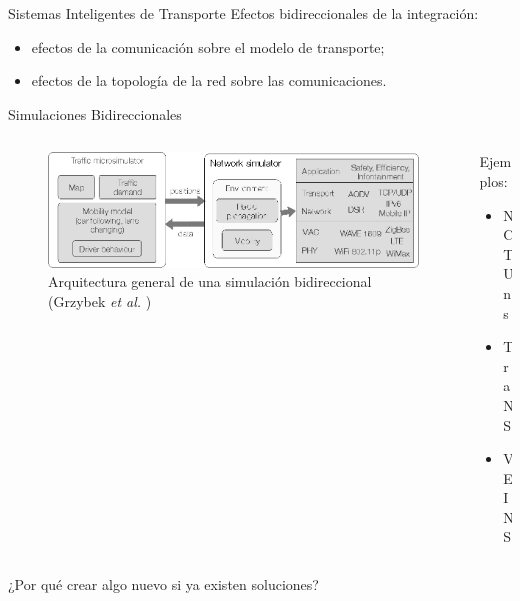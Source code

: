 \documentclass[aspectratio=169]{beamer}
\begin{document}
\begin{frame}{Sistemas Inteligentes de Transporte}
Efectos bidireccionales de la integración:\pause
\begin{itemize}
    \item efectos de la comunicación sobre el modelo de transporte;\pause
    \item efectos de la topología de la red sobre las comunicaciones.
\end{itemize}
\end{frame}

\begin{frame}{Simulaciones Bidireccionales}
\begin{columns}
    \begin{column}{.75\linewidth}
        \begin{figure}[p]
            \centering
            \includegraphics[width=\textwidth]{figuras/bidirectionalsimul.png}
            \caption{Arquitectura general de una simulación bidireccional\\(Grzybek \emph{et al.} \autocite{trendsvanet2012})}
            \label{fig:bidirsimulation}
        \end{figure}
    \end{column}
    \begin{column}{.25\linewidth}
        Ejemplos:
        \begin{itemize}
            \item NCTUns \autocite{nctuns6}
            \item TraNS \autocite{piorkowski2008trans}
            \item VEINS \autocite{sommer_german_dressler}
        \end{itemize}        
    \end{column}
\end{columns}
\end{frame}

\begin{frame}[standout]
¿Por qué crear algo nuevo si ya existen soluciones?
\end{frame}
\end{document}
